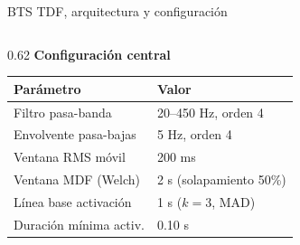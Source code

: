 \documentclass[10pt, aspectratio=169]{beamer}
\begin{document}
\begin{frame}{BTS TDF, arquitectura y configuración}
\begin{columns}[c]
\begin{column}{0.62\textwidth}
        \vspace{0.1cm}
        \textbf{Configuración central}
        \vspace{0.05cm}
        
        \centering
        \fontsize{7.5pt}{9.5pt}\selectfont
        \begin{tabular}{ll}
            \toprule
            \textbf{Parámetro} & \textbf{Valor} \\
            \midrule
            Filtro pasa-banda & 20--450 Hz, orden 4 \\
            Envolvente pasa-bajas & 5 Hz, orden 4 \\
            Ventana RMS móvil & 200 ms \\
            Ventana MDF (Welch) & 2 s (solapamiento 50\%) \\
            Línea base activación & 1 s ($k=3$, MAD) \\
            Duración mínima activ. & 0.10 s \\
            \bottomrule
        \end{tabular}
    \end{column}
\end{columns}
\end{frame}
\end{document}

